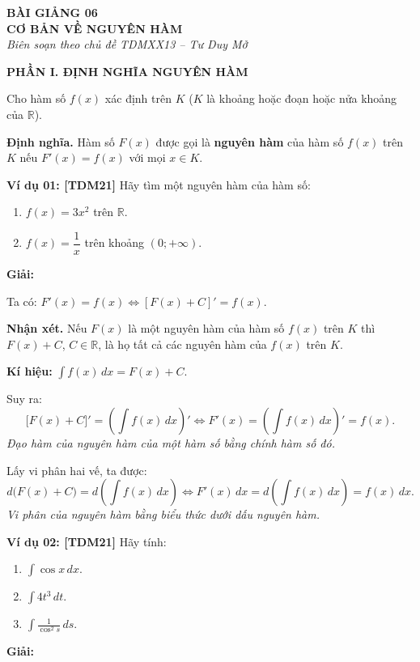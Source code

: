 \documentclass[12pt,a4paper]{article}
\newcommand{\partheading}[1]{\par\vspace{5pt}\noindent\textbf{\textcolor{sectionpurple}{#1}}\par\vspace{1pt}}
\newcommand{\example}[2][TDM21]{\par\vspace{3pt}\noindent\textbf{\textcolor{sectionpurple}{Ví dụ #2:} \textcolor{noteborder}{[#1]}}\enspace}
\newcommand{\tightitem}{\setlength{\itemsep}{1pt}\setlength{\topsep}{1pt}\setlength{\parsep}{0pt}\setlength{\partopsep}{0pt}}
\newcommand{\loigiai}[1][7mm]{\par\noindent\textbf{\textcolor{sectionpurple}{Giải:}}\par\vspace{#1}}
\begin{document}
\fontsize{12}{14.6}\selectfont
\begin{center}
  \textbf{BÀI GIẢNG 06}\\[-1pt]
  \textbf{CƠ BẢN VỀ NGUYÊN HÀM}\\[-2pt]
  {\fontsize{10.5}{12}\selectfont\itshape Biên soạn theo chủ đề TDMXX13 -- Tư Duy Mở}
\end{center}
\vspace{-7pt}

\partheading{PHẦN I. ĐỊNH NGHĨA NGUYÊN HÀM}
Cho hàm số $f(x)$ xác định trên $K$ ($K$ là khoảng hoặc đoạn hoặc nửa khoảng của $\mathbb{R}$).

\textbf{Định nghĩa.} Hàm số $F(x)$ được gọi là \textbf{nguyên hàm} của hàm số $f(x)$ trên $K$ nếu $F'(x)=f(x)$ với mọi $x\in K$.

\begin{notebox}
\example{01} Hãy tìm một nguyên hàm của hàm số:
\begin{enumerate}\tightitem
  \item $f(x)=3x^2$ trên $\mathbb{R}$.
  \item $f(x)=\dfrac1x$ trên khoảng $(0;+\infty)$.
\end{enumerate}
\end{notebox}
\loigiai[18mm]

Ta có: $F'(x)=f(x)\iff [F(x)+C]'=f(x)$.

\textbf{Nhận xét.} Nếu $F(x)$ là một nguyên hàm của hàm số $f(x)$ trên $K$ thì $F(x)+C$, $C\in\mathbb R$, là họ tất cả các nguyên hàm của $f(x)$ trên $K$.

\textbf{Kí hiệu:} $\displaystyle \int f(x)\,dx=F(x)+C$.

Suy ra:
\[
\bigl[F(x)+C\bigr]'=\left(\int f(x)\,dx\right)'
\iff F'(x)=\left(\int f(x)\,dx\right)'=f(x).
\]
\textit{Đạo hàm của nguyên hàm của một hàm số bằng chính hàm số đó.}

Lấy vi phân hai vế, ta được:
\[
 d\bigl(F(x)+C\bigr)=d\left(\int f(x)\,dx\right)
 \iff F'(x)\,dx=d\left(\int f(x)\,dx\right)=f(x)\,dx.
\]
\textit{Vi phân của nguyên hàm bằng biểu thức dưới dấu nguyên hàm.}

\begin{notebox}
\example{02} Hãy tính:
\begin{enumerate}\tightitem
  \item $\displaystyle\int\cos x\,dx$.
  \item $\displaystyle\int4t^3\,dt$.
  \item $\displaystyle\int\frac{1}{\cos^2s}\,ds$.
\end{enumerate}
\end{notebox}
\loigiai[21mm]
\end{document}
